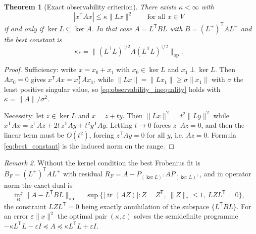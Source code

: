 \documentclass[11pt]{amsart}
\numberwithin{equation}{section}
\theoremstyle{plain}
\newtheorem{theorem}{Theorem}[section]
\theoremstyle{definition}
\theoremstyle{remark}
\newtheorem{remark}[theorem]{Remark}
\DeclareMathOperator{\tr}{tr}
\begin{document}
\begin{theorem}[Exact observability criterion]
\label{thm:observability}
There exists $\kappa<\infty$ with
\begin{equation}
|x^{\mathsf T}Ax|\le\kappa\|Lx\|^2\qquad\text{for all }x\in V
\label{eq:observability_inequality}
\end{equation}
if and only if $\ker L\subseteq\ker A$. In that case
$A=L^{\mathsf T}BL$ with $B=(L^{+})^{\mathsf T}AL^{+}$ and the best
constant is
\begin{equation}
\kappa_*=\bigl\|(L^{\mathsf T}L)^{\dagger/2}A(L^{\mathsf T}L)^{\dagger/2}\bigr\|_{\mathrm{op}} .
\label{eq:best_constant}
\end{equation}
\end{theorem}

\begin{proof}
Sufficiency: write $x=x_0+x_1$ with $x_0\in\ker L$ and
$x_1\perp\ker L$. Then $Ax_0=0$ gives
$x^{\mathsf T}Ax=x_1^{\mathsf T}Ax_1$, while
$\|Lx\|=\|Lx_1\|\ge\sigma\|x_1\|$ with $\sigma$ the least positive
singular value, so \eqref{eq:observability_inequality} holds with
$\kappa=\|A\|/\sigma^2$.

Necessity: let $z\in\ker L$ and $x=z+ty$. Then
$\|Lx\|^2=t^2\|Ly\|^2$ while
$x^{\mathsf T}Ax=z^{\mathsf T}Az+2t\,z^{\mathsf T}Ay+t^2y^{\mathsf T}Ay$.
Letting $t\to0$ forces $z^{\mathsf T}Az=0$, and then the linear term must
be $O(t^2)$, forcing $z^{\mathsf T}Ay=0$ for all $y$, i.e. $Az=0$.
Formula \eqref{eq:best_constant} is the induced norm on the range.
\end{proof}

\begin{remark}
\label{rem:duality_and_sdp}
Without the kernel condition the best Frobenius fit is
$B_F=(L^{+})^{\mathsf T}AL^{+}$ with residual
$R_F=A-P_{(\ker L)^{\perp}}AP_{(\ker L)^{\perp}}$, and in operator norm
the exact dual is
\begin{equation}
\inf_B\|A-L^{\mathsf T}BL\|_{\mathrm{op}}
=\sup\bigl\{|\tr(AZ)| : Z=Z^{\mathsf T},\ \|Z\|_*\le1,\ LZL^{\mathsf T}=0\bigr\},
\label{eq:operator_norm_dual}
\end{equation}
the constraint $LZL^{\mathsf T}=0$ being exactly annihilation of the
subspace $\{L^{\mathsf T}BL\}$. For an error $\varepsilon\|x\|^2$ the
optimal pair $(\kappa,\varepsilon)$ solves the semidefinite programme
$-\kappa L^{\mathsf T}L-\varepsilon I\preceq A\preceq
\kappa L^{\mathsf T}L+\varepsilon I$.
\end{remark}
\end{document}
